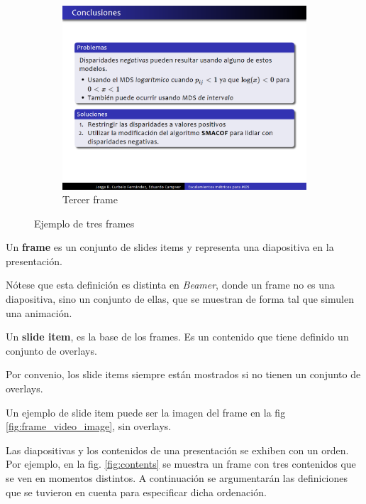 \begin{figure}[tb]
\begin{subfigure}[b]{0.3\textwidth}
 				\includegraphics[width=\textwidth]{img/f3}
 				\caption{Tercer frame}
 				\label{fig:frames_c}	
 			\end{subfigure}			 			
 			\caption{Ejemplo de tres frames}
 			\label{fig:frames}
 		\end{figure}

 		\begin{definition}
 		\label{def:frame}
			Un \textbf{frame} es un conjunto de slides items y representa una diapositiva en la presentación. 
 		\end{definition}

 		Nótese que esta definición es distinta en \textit{Beamer}, donde un frame no es una diapositiva, sino un conjunto de ellas, que se muestran de forma tal que simulen una animación.

 		\begin{definition}
 		\label{def:slide_item}
 			Un \textbf{slide item}, es la base de los frames. Es un contenido que tiene definido un conjunto de overlays. 
 		\end{definition}

 		Por convenio, los slide items siempre están mostrados si no tienen un conjunto de overlays.

		Un ejemplo de slide item puede ser la imagen del frame en la fig \ref{fig:frame_video_image}, sin overlays.

		Las diapositivas y los contenidos de una presentación se exhiben con un orden. Por ejemplo, en la fig. \ref{fig:contents} se muestra un frame con tres contenidos que se ven en momentos distintos. A continuación se argumentarán las definiciones que se tuvieron en cuenta para especificar dicha ordenación.

